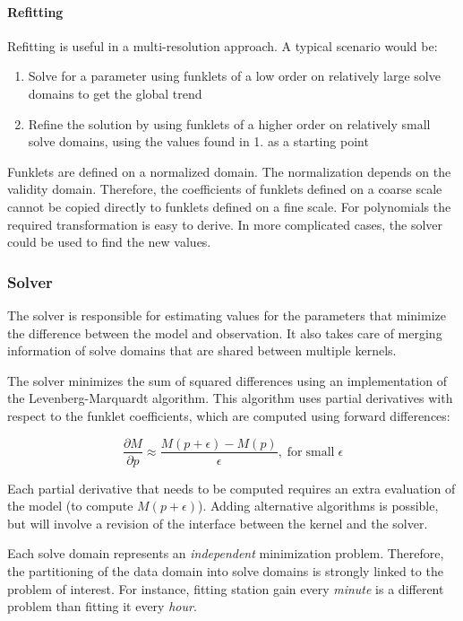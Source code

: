 \documentclass[10pt]{lofar}
\begin{document}
\paragraph{Refitting}
Refitting is useful in a multi-resolution approach. A typical scenario would be:
\begin{enumerate}
\item Solve for a parameter using funklets of a low order on
relatively large solve domains to get the global trend
\item Refine the solution by using funklets of a higher order on relatively
small solve domains, using the values found in 1. as a starting point
\end{enumerate}

Funklets are defined on a normalized domain. The normalization depends on the
validity domain. Therefore, the coefficients of funklets defined on a coarse
scale cannot be copied directly to funklets defined on a fine scale. For
polynomials the required transformation is easy to derive. In more complicated
cases, the solver could be used to find the new values.

\subsubsection{Solver}
\label{subsubsec:design-solver}

The solver is responsible for estimating values for the parameters that minimize
the difference between the model and observation. It also takes care of merging
information of solve domains that are shared between multiple kernels.

The solver minimizes the sum of squared differences using an implementation of
the Levenberg-Marquardt algorithm. This algorithm uses partial derivatives with
respect to the funklet coefficients, which are computed using forward
differences:

\[
\frac{\partial M}{\partial p} \approx \frac{M(p + \epsilon) -
M(p)}{\epsilon}\mathrm{,}\;\mathrm{for}\;\mathrm{small}\;\epsilon
\]

Each partial derivative that needs to be computed requires an extra evaluation
of the model (to compute $M(p + \epsilon)$). Adding alternative algorithms is
possible, but will involve a revision of the interface between the kernel and
the solver.

Each solve domain represents an \emph{independent} minimization problem.
Therefore, the partitioning of the data domain into solve domains is strongly
linked to the problem of interest. For instance, fitting station gain every
\emph{minute} is a different problem than fitting it every \emph{hour}.
\end{document}
